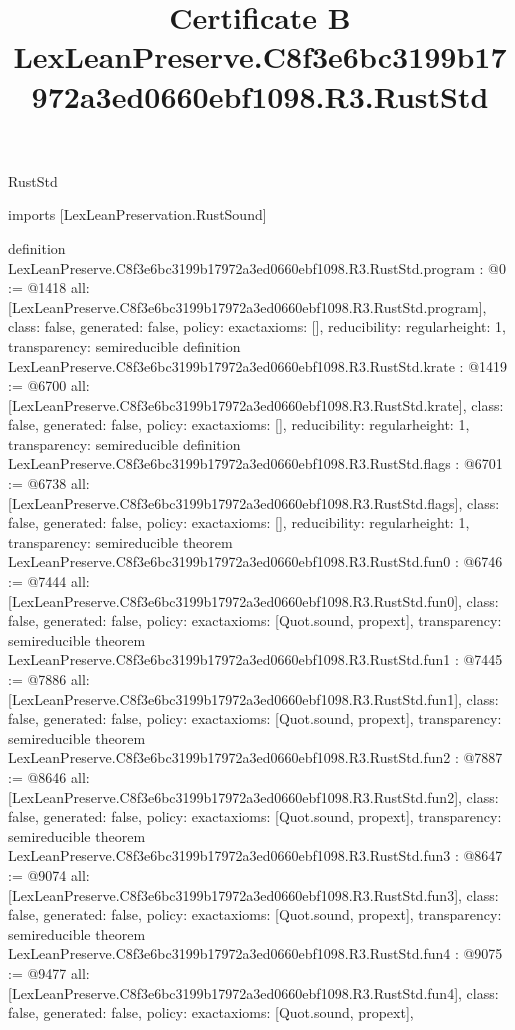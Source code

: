 \begin{lexlean}{RustStd}
\title{Certificate B LexLeanPreserve.C8f3e6bc3199b17972a3ed0660ebf1098.R3.RustStd}
\begin{coremodule}
imports [LexLeanPreservation.RustSound]

definition LexLeanPreserve.C8f3e6bc3199b17972a3ed0660ebf1098.R3.RustStd.program : @0 := @1418 {
  all: [LexLeanPreserve.C8f3e6bc3199b17972a3ed0660ebf1098.R3.RustStd.program],
  class: false,
  generated: false,
  policy: exact{axioms: []},
  reducibility: regular{height: 1},
  transparency: semireducible
}
definition LexLeanPreserve.C8f3e6bc3199b17972a3ed0660ebf1098.R3.RustStd.krate : @1419 := @6700 {
  all: [LexLeanPreserve.C8f3e6bc3199b17972a3ed0660ebf1098.R3.RustStd.krate],
  class: false,
  generated: false,
  policy: exact{axioms: []},
  reducibility: regular{height: 1},
  transparency: semireducible
}
definition LexLeanPreserve.C8f3e6bc3199b17972a3ed0660ebf1098.R3.RustStd.flags : @6701 := @6738 {
  all: [LexLeanPreserve.C8f3e6bc3199b17972a3ed0660ebf1098.R3.RustStd.flags],
  class: false,
  generated: false,
  policy: exact{axioms: []},
  reducibility: regular{height: 1},
  transparency: semireducible
}
theorem LexLeanPreserve.C8f3e6bc3199b17972a3ed0660ebf1098.R3.RustStd.fun0 : @6746 := @7444 {
  all: [LexLeanPreserve.C8f3e6bc3199b17972a3ed0660ebf1098.R3.RustStd.fun0],
  class: false,
  generated: false,
  policy: exact{axioms: [Quot.sound, propext]},
  transparency: semireducible
}
theorem LexLeanPreserve.C8f3e6bc3199b17972a3ed0660ebf1098.R3.RustStd.fun1 : @7445 := @7886 {
  all: [LexLeanPreserve.C8f3e6bc3199b17972a3ed0660ebf1098.R3.RustStd.fun1],
  class: false,
  generated: false,
  policy: exact{axioms: [Quot.sound, propext]},
  transparency: semireducible
}
theorem LexLeanPreserve.C8f3e6bc3199b17972a3ed0660ebf1098.R3.RustStd.fun2 : @7887 := @8646 {
  all: [LexLeanPreserve.C8f3e6bc3199b17972a3ed0660ebf1098.R3.RustStd.fun2],
  class: false,
  generated: false,
  policy: exact{axioms: [Quot.sound, propext]},
  transparency: semireducible
}
theorem LexLeanPreserve.C8f3e6bc3199b17972a3ed0660ebf1098.R3.RustStd.fun3 : @8647 := @9074 {
  all: [LexLeanPreserve.C8f3e6bc3199b17972a3ed0660ebf1098.R3.RustStd.fun3],
  class: false,
  generated: false,
  policy: exact{axioms: [Quot.sound, propext]},
  transparency: semireducible
}
theorem LexLeanPreserve.C8f3e6bc3199b17972a3ed0660ebf1098.R3.RustStd.fun4 : @9075 := @9477 {
  all: [LexLeanPreserve.C8f3e6bc3199b17972a3ed0660ebf1098.R3.RustStd.fun4],
  class: false,
  generated: false,
  policy: exact{axioms: [Quot.sound, propext]},
}
\end{coremodule}
\end{lexlean}
